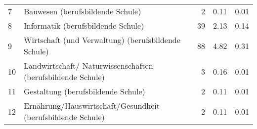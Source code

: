 \begin{longtable}{lXrrr}
     7 &
     \multicolumn{1}{X}{ Bauwesen (berufsbildende Schule)   } &


       \num{2} &
       \num[round-mode=places,round-precision=2]{0,11} &
         \num[round-mode=places,round-precision=2]{0,01} \\

     8 &
     \multicolumn{1}{X}{ Informatik (berufsbildende Schule)   } &


       \num{39} &
       \num[round-mode=places,round-precision=2]{2,13} &
         \num[round-mode=places,round-precision=2]{0,14} \\

     9 &
     \multicolumn{1}{X}{ Wirtschaft (und Verwaltung) (berufsbildende Schule)   } &


       \num{88} &
       \num[round-mode=places,round-precision=2]{4,82} &
         \num[round-mode=places,round-precision=2]{0,31} \\

     10 &
     \multicolumn{1}{X}{ Landwirtschaft/ Naturwissenschaften (berufsbildende Schule)   } &


       \num{3} &
       \num[round-mode=places,round-precision=2]{0,16} &
         \num[round-mode=places,round-precision=2]{0,01} \\

     11 &
     \multicolumn{1}{X}{ Gestaltung (berufsbildende Schule)   } &


       \num{2} &
       \num[round-mode=places,round-precision=2]{0,11} &
         \num[round-mode=places,round-precision=2]{0,01} \\

     12 &
     \multicolumn{1}{X}{ Ernährung/Hauswirtschaft/Gesundheit (berufsbildende Schule)   } &


       \num{2} &
       \num[round-mode=places,round-precision=2]{0,11} &
         \num[round-mode=places,round-precision=2]{0,01} \\


\end{longtable}
